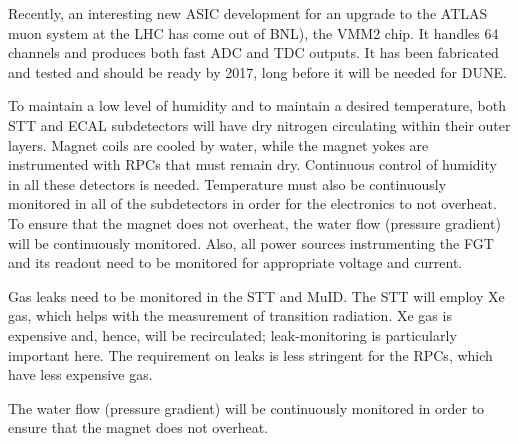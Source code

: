 Recently, an interesting new ASIC development for an upgrade to the ATLAS muon system at the LHC
has come out of BNL), the VMM2 chip. %
 It handles 64 channels and produces both fast ADC and TDC outputs.
It has been fabricated and tested and should be ready by 2017, long before it will be needed for DUNE.

To maintain a low level of 
humidity and to maintain a desired temperature, both STT and ECAL subdetectors
will have dry nitrogen circulating within their outer layers.  Magnet coils are cooled by water, 
while the magnet yokes are instrumented with RPCs that must remain dry. Continuous control of 
humidity in all these detectors is needed.
Temperature must also be continuously monitored in all of the subdetectors
in order for the electronics to not overheat. 
To ensure that the magnet does not overheat, the water flow (pressure gradient) will be continuously monitored.  
Also, all power sources instrumenting the FGT and its readout need to be monitored for 
appropriate voltage and current.

Gas leaks need to be monitored in the STT and MuID.
The STT will employ Xe gas, which helps with the measurement of transition radiation.
Xe gas is expensive and, hence, will be recirculated; leak-monitoring is particularly important here.   
The requirement on leaks is less 
stringent for the RPCs, which have less expensive gas.

The water flow (pressure gradient) will be continuously monitored in order to ensure 
that the magnet does not overheat. 

